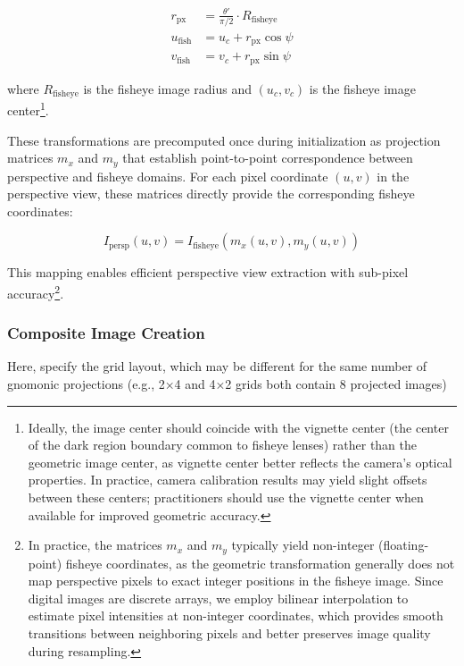 \documentclass[twocolumn]{svjour3}          %
\begin{document}
\begin{align}
	r_{\text{px}} &= \frac{\theta'}{\pi/2} \cdot R_{\text{fisheye}} \\
	u_{\text{fish}} &= u_c + r_{\text{px}} \cos\psi \\
	v_{\text{fish}} &= v_c + r_{\text{px}} \sin\psi
	\label{eq:fisheye_mapping}
\end{align}

where $R_{\text{fisheye}}$ is the fisheye image radius and $(u_c, v_c)$ is the fisheye image center\footnote{Ideally, the image center should coincide with the vignette center (the center of the dark region boundary common to fisheye lenses) rather than the geometric image center, as vignette center better reflects the camera's optical properties. In practice, camera calibration results may yield slight offsets between these centers; practitioners should use the vignette center when available for improved geometric accuracy.}.

These transformations are precomputed once during initialization as projection matrices $m_x$ and $m_y$ that establish point-to-point correspondence between perspective and fisheye domains. For each pixel coordinate $(u, v)$ in the perspective view, these matrices directly provide the corresponding fisheye coordinates:

\begin{equation}
	I_{\text{persp}}(u,v) = I_{\text{fisheye}}(m_x(u,v), m_y(u,v))
	\label{eq:projection_matrices}
\end{equation}

\noindent
This mapping enables efficient perspective view extraction with sub-pixel accuracy\footnote{In practice, the matrices $m_x$ and $m_y$ typically yield non-integer (floating-point) fisheye coordinates, as the geometric transformation generally does not map perspective pixels to exact integer positions in the fisheye image. Since digital images are discrete arrays, we employ bilinear interpolation to estimate pixel intensities at non-integer coordinates, which provides smooth transitions between neighboring pixels and better preserves image quality during resampling.}.

\subsubsection{Composite Image Creation}
\label{sec:composite_creation}

Here, specify the grid layout, which may be different for the same number of gnomonic projections (e.g., 2×4 and 4×2 grids both contain 8 projected images)
\end{document}
